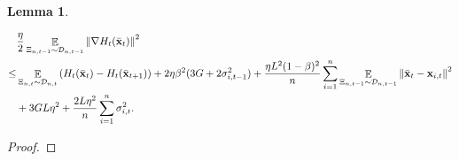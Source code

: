 \documentclass{article}
\newtheorem{Lemma}{\bf{Lemma}}
\begin{document}
\begin{Lemma}
\label{lemma_gradient_norm_bound}

\begin{align}
\nonumber
& \frac{\eta}{2}\mathop{\mathbb{E}}_{ \Xi_{n,t-1} \sim \mathcal{D}_{n,t-1} }\left\lVert\nabla H_t(\bar{{\bf x}}_t)\right\rVert^2  \\ \nonumber 
\le & \mathop{\mathbb{E}}_{ \Xi_{n,t} \sim \mathcal{D}_{n,t} } \left( H_t(\bar{{\bf x}}_t) - H_t(\bar{{\bf x}}_{t+1}) \right) + 2\eta\beta^2(3G + 2\sigma_{i,t-1}^2) +  \frac{\eta L^2(1-\beta)^2}{n}\sum_{i=1}^n\mathop{\mathbb{E}}_{ \Xi_{n,t-1} \sim \mathcal{D}_{n,t-1} }\left\lVert\bar{{\bf x}}_t - {\bf x}_{i,t} \right\rVert^2 \\ \label{equa_lemma_gradient_norm_bound}  
& + 3GL\eta^2  + \frac{2L\eta^2}{n}\sum_{i=1}^n \sigma_{i,t}^2.
\end{align}
\end{Lemma}
\begin{proof}


\end{proof}
\end{document}
